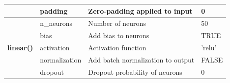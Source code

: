 \documentclass[12pt,twoside]{scrreport}
\begin{document}
\begin{table}[t]
{\begin{tabular}{|llll|}
			& padding       & Zero-padding applied to input                                     & 0         \\
			\hline
			\multirow{5}{*}{\textbf{linear()}}   & n\_neurons    & Number of neurons                                                                                              & 50        \\
			& bias          & Add bias to neurons                                                              & TRUE      \\
			& activation    & Activation function                                                      & 'relu'    \\
			& normalization & Add batch normalization to output                                                      & FALSE     \\
			& dropout       & Dropout probability of neurons                                          & 0         \\ \hline
		\end{tabular}
	}
	
	\label{layers}
\end{table}
\end{document}
